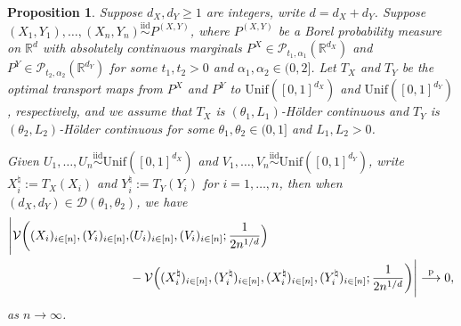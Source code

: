 \documentclass[11pt]{article}
\newtheorem{prop}[thm]{Proposition}
\begin{document}
\begin{prop}\label{prop: VonRawData}
Suppose $d_X, d_Y \geq 1$ are integers, write $d = d_X + d_Y$. Suppose $(X_1, Y_1), \ldots, (X_n, Y_n) \stackrel{\mathrm{iid}}{\sim} P^{(X, Y)}$, where $P^{(X, Y)}$ be a Borel probability measure on $\mathbb{R}^{d}$ with absolutely continuous marginals $P^X \in \mathcal{P}_{t_1, \alpha_1}(\mathbb{R}^{d_X})$ and $P^Y\in \mathcal{P}_{t_2, \alpha_2}(\mathbb{R}^{d_Y})$ for some $t_1, t_2 > 0$ and $\alpha_1, \alpha_2 \in (0, 2]$. Let $T_X$ and $T_Y$ be the optimal transport maps from $P^X$ and $P^Y$ to $\mathrm{Unif}([0, 1]^{d_X})$ and $\mathrm{Unif}([0, 1]^{d_Y})$, respectively, and we assume that $T_X$ is $(\theta_1, L_1)$-H\"older continuous and $T_Y$ is $(\theta_2, L_2)$-H\"older continuous for some $\theta_1, \theta_2 \in (0, 1]$ and $L_1, L_2 >0$. 

Given $U_1, \ldots, U_n \stackrel{\mathrm{iid}}{\sim} \mathrm{Unif}([0, 1]^{d_X})$ and $V_1, \ldots, V_n \stackrel{\mathrm{iid}}{\sim} \mathrm{Unif}([0, 1]^{d_Y})$, write $X_i^\natural  := T_X(X_i)$ and $Y_i^\natural  := T_Y(Y_i)$ for $i = 1, \ldots, n$, then when $(d_X, d_Y) \in \mathcal{D}(\theta_1, \theta_2)$, we have
\begin{align*}
    \Biggl|\mathcal{V}\biggl((X_i)_{i\in[n]}, (Y_i)_{i\in[n]}, &(U_i)_{i\in[n]},(V_i)_{i\in[n]}; \frac{1}{2n^{1/d}} \Bigr) \\
    &- \mathcal{V}\Bigl((X_i^\natural)_{i\in[n]}, (Y_i^\natural )_{i\in[n]}, ( X_i^\natural)_{i\in[n]}, ( Y_i^\natural )_{i\in[n]}; \frac{1}{2n^{1/d}}\biggr)\Biggr| \stackrel{\mathrm{p}}{\longrightarrow} 0,
\end{align*}
as $n \to \infty$.
\end{prop}
\end{document}
